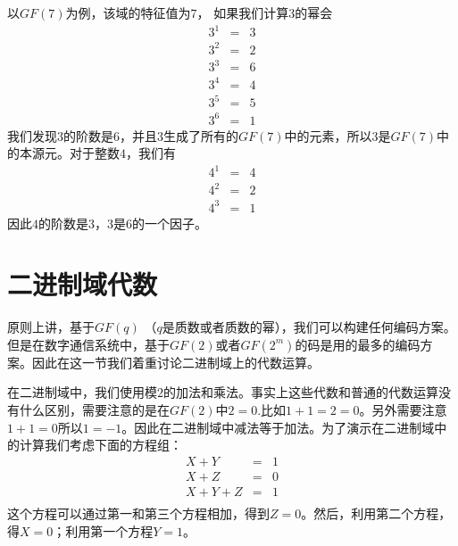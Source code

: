 \documentclass[10pt,a4paper,UTF8]{article}
\begin{document}
以\(GF(7)\)为例，该域的特征值为\(7\)， 如果我们计算\(3\)的幂会
\begin{eqnarray*}
3^{1}&=&3 \\
3^{2}&=&2 \\
3^{3}&=&6 \\
3^{4}&=&4 \\
3^{5}&=&5 \\
3^{6}&=&1
\end{eqnarray*}
我们发现\(3\)的阶数是\(6\)，并且\(3\)生成了所有的\(GF(7)\)中的元素，所以\(3\)是\(GF(7)\)中的本源元。对于整数\(4\)，我们有
\begin{eqnarray*}
4^{1}&=&4 \\
4^{2}&=&2 \\
4^{3}&=&1
\end{eqnarray*}
因此\(4\)的阶数是\(3\)，\(3\)是\(6\)的一个因子。
\section{二进制域代数}
\label{sec:org935f612}


原则上讲，基于\(GF(q)\) （\(q\)是质数或者质数的幂），我们可以构建任何编码方案。但是在数字通信系统中，基于\(GF(2)\)或者\(GF(2^{m})\)的码是用的最多的编码方案。因此在这一节我们着重讨论二进制域上的代数运算。

在二进制域中，我们使用模\(2\)的加法和乘法。事实上这些代数和普通的代数运算没有什么区别，需要注意的是在\(GF(2)\)中\(2=0\).比如\(1+1=2=0\)。另外需要注意\(1+1=0\)所以\(1=-1\)。因此在二进制域中减法等于加法。为了演示在二进制域中的计算我们考虑下面的方程组：
\begin{eqnarray*}
X+Y&=&1 \\
X+Z&=&0 \\
X+Y+Z&=&1 \\
\end{eqnarray*}
这个方程可以通过第一和第三个方程相加，得到\(Z=0\)。然后，利用第二个方程，得\(X=0\)；利用第一个方程\(Y=1\)。
\end{document}
